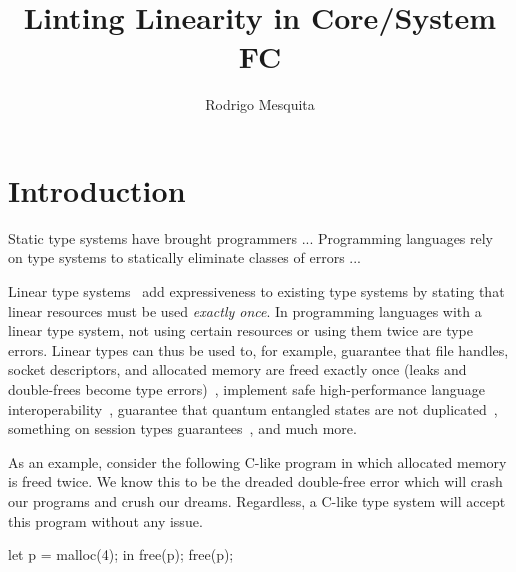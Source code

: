 \documentclass[]{lwnovathesis}
\title{Linting Linearity in Core/System FC}
\author{Rodrigo Mesquita}
\begin{document}
\frontmatter

\maketitle
\tableofcontents

\mainmatter


\chapter{Introduction}




Static type systems have brought programmers ...
Programming languages rely on type systems to statically eliminate classes of
errors ...

Linear type systems~\cite{} add expressiveness to existing type systems by
stating that linear resources must be used \emph{exactly once}. In programming
languages with a linear type system, not using certain resources or using them
twice are type errors. Linear types can thus be used to, for example, guarantee
that file handles, socket descriptors, and allocated memory are freed exactly
once (leaks and double-frees become type errors)~\cite{}, implement safe
high-performance language interoperability~\cite{}, guarantee that quantum
entangled states are not duplicated~\cite{}, something on session types
guarantees~\cite{}, and much more.

As an example, consider the following C-like program in which allocated memory
is freed twice. We know this to be the dreaded double-free error which will
crash our programs and crush our dreams. Regardless, a C-like type system will
accept this program without any issue.
\begin{code}
let p = malloc(4);
 in free(p);
    free(p);
\end{code}
\end{document}
